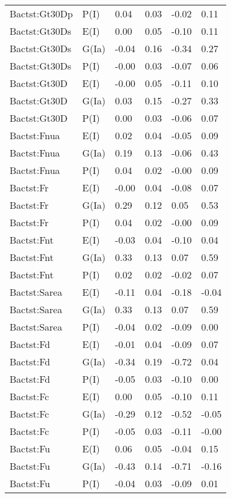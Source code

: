 \begin{center}
\begin{longtable}{|p{1.1in}|p{0.7in}|p{0.7in}|p{0.6in}|p{0.6in}|p{0.6in}|}
  Bactst:Gt30Dp & P(I) & 0.04 & 0.03 & -0.02 & 0.11 \\ 
  Bactst:Gt30Ds & E(I) & 0.00 & 0.05 & -0.10 & 0.11 \\ 
  Bactst:Gt30Ds & G(Ia) & -0.04 & 0.16 & -0.34 & 0.27 \\ 
  Bactst:Gt30Ds & P(I) & -0.00 & 0.03 & -0.07 & 0.06 \\ 
  Bactst:Gt30D & E(I) & -0.00 & 0.05 & -0.11 & 0.10 \\ 
  Bactst:Gt30D & G(Ia) & 0.03 & 0.15 & -0.27 & 0.33 \\ 
  Bactst:Gt30D & P(I) & 0.00 & 0.03 & -0.06 & 0.07 \\ 
  Bactst:Fnua & E(I) & 0.02 & 0.04 & -0.05 & 0.09 \\ 
  Bactst:Fnua & G(Ia) & 0.19 & 0.13 & -0.06 & 0.43 \\ 
  Bactst:Fnua & P(I) & 0.04 & 0.02 & -0.00 & 0.09 \\ 
  Bactst:Fr & E(I) & -0.00 & 0.04 & -0.08 & 0.07 \\ 
  Bactst:Fr & G(Ia) & 0.29 & 0.12 & 0.05 & 0.53 \\ 
  Bactst:Fr & P(I) & 0.04 & 0.02 & -0.00 & 0.09 \\ 
  Bactst:Fnt & E(I) & -0.03 & 0.04 & -0.10 & 0.04 \\ 
  Bactst:Fnt & G(Ia) & 0.33 & 0.13 & 0.07 & 0.59 \\ 
  Bactst:Fnt & P(I) & 0.02 & 0.02 & -0.02 & 0.07 \\ 
  Bactst:Sarea & E(I) & -0.11 & 0.04 & -0.18 & -0.04 \\ 
  Bactst:Sarea & G(Ia) & 0.33 & 0.13 & 0.07 & 0.59 \\ 
  Bactst:Sarea & P(I) & -0.04 & 0.02 & -0.09 & 0.00 \\ 
  Bactst:Fd & E(I) & -0.01 & 0.04 & -0.09 & 0.07 \\ 
  Bactst:Fd & G(Ia) & -0.34 & 0.19 & -0.72 & 0.04 \\ 
  Bactst:Fd & P(I) & -0.05 & 0.03 & -0.10 & 0.00 \\ 
  Bactst:Fc & E(I) & 0.00 & 0.05 & -0.10 & 0.11 \\ 
  Bactst:Fc & G(Ia) & -0.29 & 0.12 & -0.52 & -0.05 \\ 
  Bactst:Fc & P(I) & -0.05 & 0.03 & -0.11 & -0.00 \\ 
  Bactst:Fu & E(I) & 0.06 & 0.05 & -0.04 & 0.15 \\ 
  Bactst:Fu & G(Ia) & -0.43 & 0.14 & -0.71 & -0.16 \\ 
  Bactst:Fu & P(I) & -0.04 & 0.03 & -0.09 & 0.01 \\ 

\end{longtable}
\end{center}

